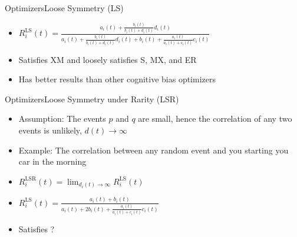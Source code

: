 \documentclass[
	aspectratio=169,	%
	onlytextwidth,		%
	t,					%
	]{beamer}
\begin{document}
	\begin{frame}[fragile]{Optimizers}{Loose Symmetry (LS)}

		\begin{itemize}
			
		\item<1-> $R^{\text{LS}}_{i}(t) = \frac{a_{i}(t) 
		+ \frac{b_{i}(t)}{b_{i}(t) + d_{i}(t)}d_{i}(t)}
		{a_{i}(t) 
		+ \frac{b_{i}(t)}{b_{i}(t) + d_{i}(t)}d_{i}(t) 
		+ b_{i}(t) 
		+ \frac{a_{i}(t)}{a_{i}(t) + c_{i}(t)}c_{i}(t)}$~\cite{tak10, man21} 
		\vspace{10pt}
		\item<2-> Satisfies XM and loosely satisfies S, MX, and ER~\cite{tak10} 
		\item <3-> Has better results than other cognitive bias optimizers~\cite{smt} %
		\end{itemize}
	\end{frame}

	\begin{frame}[fragile]{Optimizers}{Loose Symmetry under Rarity (LSR)}

		\begin{itemize}

		\item<1-> Assumption: The events $p$ and $q$ are small, hence the correlation of any two events is unlikely, $d(t) \rightarrow \infty$~\cite{hat07}
		\item <2-> Example: The correlation between any random event and you starting you car in the morning~\cite{hat07}
		\item<3-> $R^{\text{LSR}}_{i}(t) = \lim_{d_{i}(t) \to \infty}R^{\text{LS}}_{i}(t)$
		\item<4-> $R^{\text{LS}}_{i}(t) = \frac{a_{i}(t) 
		+ b_{i}(t)}
		{a_{i}(t) 
		+ 2b_{i}(t) 
		+ \frac{a_{i}(t)}{a_{i}(t) + c_{i}(t)}c_{i}(t)}$ \cite{tak10}
		\vspace{10pt}
		\item<5-> Satisfies ?~\cite{smt} %
		\end{itemize}
	\end{frame}
\end{document}
